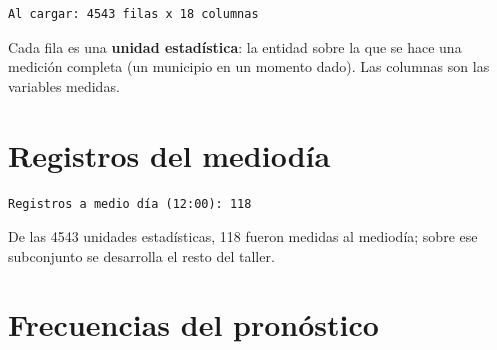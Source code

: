 \documentclass[oneside, openany, fontset=libertinus]{mitthesis}
\newenvironment{Shaded}{\begin{snugshade}}{\end{snugshade}}
\newcommand{\AttributeTok}[1]{\textcolor[rgb]{0.40,0.45,0.13}{#1}}
\newcommand{\ConstantTok}[1]{\textcolor[rgb]{0.56,0.35,0.01}{#1}}
\newcommand{\DecValTok}[1]{\textcolor[rgb]{0.68,0.00,0.00}{#1}}
\newcommand{\FunctionTok}[1]{\textcolor[rgb]{0.28,0.35,0.67}{#1}}
\newcommand{\NormalTok}[1]{\textcolor[rgb]{0.00,0.23,0.31}{#1}}
\newcommand{\OtherTok}[1]{\textcolor[rgb]{0.00,0.23,0.31}{#1}}
\newcommand{\SpecialCharTok}[1]{\textcolor[rgb]{0.37,0.37,0.37}{#1}}
\newcommand{\StringTok}[1]{\textcolor[rgb]{0.13,0.47,0.30}{#1}}
\begin{document}
\begin{verbatim}
Al cargar: 4543 filas x 18 columnas
\end{verbatim}

Cada fila es una \textbf{unidad estadística}: la entidad sobre la que se
hace una medición completa (un municipio en un momento dado). Las
columnas son las variables medidas.

\chapter{Registros del mediodía}\label{preparacion}

\begin{Shaded}
\end{Shaded}

\begin{verbatim}
Registros a medio día (12:00): 118 
\end{verbatim}

De las 4543 unidades estadísticas, 118 fueron medidas al mediodía; sobre
ese subconjunto se desarrolla el resto del taller.

\chapter{Frecuencias del pronóstico}\label{p2}

\begin{Shaded}
\end{Shaded}
\end{document}
